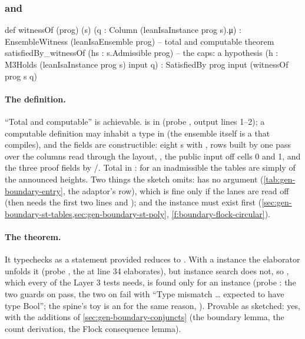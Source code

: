 \subsubsection{\texorpdfstring{\protect{}}{witnessOf} and \texorpdfstring{\protect{}}{satisfiedBy\_witnessOf}}\label{sec:gen-boundary-st-witnessof}

\begin{leancode}
def witnessOf (prog) (s) (q : Column (leanIsaInstance prog s).μ) :
    EnsembleWitness (leanIsaEnsemble prog)                            -- total and computable
theorem satisfiedBy_witnessOf (hs : s.Admissible prog)                 -- the caps: a hypothesis
    (h : M3Holds (leanIsaInstance prog s) input q) : SatisfiedBy prog input (witnessOf prog s q)
\end{leancode}

\paragraph{The definition.} \enquote{Total and computable} is achievable. 
is in  (probe , output lines 1--2); a computable definition may inhabit a
type in  (the ensemble itself is a  that compiles), and the fields are
constructible: eight s with , rows
built by one pass over the columns read through the layout,
, the public input off cells 0
and 1, and the three proof fields by /. Total in : for an inadmissible
 the tables are simply of the announced heights. Two things the sketch omits:
 has no  argument (\cref{tab:gen-boundary-entry}, the adaptor's row),
which is fine only if the lanes are read off  (then  needs the first
two lines and ); and the instance must exist first
(\cref{sec:gen-boundary-st-tables,sec:gen-boundary-st-poly}, \cref{f:boundary-flock-circular}).

\paragraph{The theorem.} It typechecks as a statement provided
 reduces to . With a  instance the
elaborator unfolds it (probe , the  at line 34 elaborates), but
instance search does not, so , which
every  of the Layer 3 tests needs, is found only for an  instance (probe
: the two guards on  pass, the two on  fail with
\enquote{Type mismatch … expected to have type Bool}; the spine's toy is an  for the
same reason, ). Provable as sketched: yes, with the additions of
\cref{sec:gen-boundary-conjuncts} (the boundary lemma, the count derivation, the Flock consequence
lemma).

